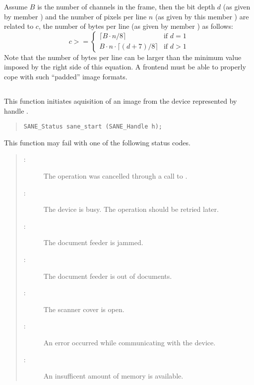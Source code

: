 \documentclass[11pt,DVIps]{report}
\begin{document}
Assume $B$ is the number of channels in the frame, then the bit depth
$d$ (as given by member ) and the number of pixels per
line $n$ (as given by this member ) are
related to $c$, the number of bytes per line (as given by member
) as follows:
\[
  c >= \left\{
  \begin{array}{ll}
    \lceil B\cdot n / 8\rceil & \mbox{if $d=1$}\\
    B\cdot n \cdot \lceil (d + 7)/8 \rceil & \mbox{if $d>1$}
  \end{array}
  \right.
\]
Note that the number of bytes per line can be larger than the minimum
value imposed by the right side of this equation.  A frontend must be
able to properly cope with such ``padded'' image formats.


\subsection{}

This function initiates aquisition of an image from the device
represented by handle .
\begin{quote}
\begin{verbatim}
SANE_Status sane_start (SANE_Handle h);
\end{verbatim}
\end{quote}
This function may fail with one of the following status codes.
\begin{quote}
\begin{description}
\item[:] The operation was cancelled through
  a call to .
\item[:] The device is busy. The
  operation should be retried later.
\item[:] The document feeder is jammed.
\item[:] The document feeder is out of
  documents.
\item[:] The scanner cover is open.
\item[:] An error occurred while communicating
  with the device.
\item[:] An insufficent amount of memory
  is available.
\end{description}
\end{quote}
\end{document}
